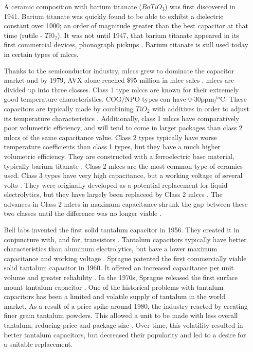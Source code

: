 A ceramic composition with barium titanate ($BaTiO_3$) was first discovered in 1941. Barium titanate was quickly found to be able to exhibit a dielectric constant over 1000; an order of magnitude greater than the best capacitor at that time (rutile - $Ti0_2$). It was not until 1947, that barium titanate appeared in its first commercial devices, phonograph pickups \cite{piezCer}\cite{hist_cerFilt}\cite[Ch 3 Sec III]{cerMaterials}. Barium titanate is still used today in certain types of \glspl{mlcc}.

Thanks to the semiconductor industry, \glspl{mlcc} grew to dominate the capacitor market and by 1979, AVX alone reached $\$95$ million in \gls{mlcc} sales \cite{avx_hist}.
\glspl{mlcc} are divided up into three classes. Class 1 type \glspl{mlcc} are known for their extremely good temperature characteristics. COG/NPO types can have 0-30ppm/$^o$C. These capacitors are typically made by combining $TiO_2$ with additives in order to adjust its temperature characteristics \cite{intro_cerCaps}. Additionally, class 1 \glspl{mlcc} have comparatively poor volumetric efficiency, and will tend to come in larger packages than class 2 \glspl{mlcc} of the same capacitance value. Class 2 types typically have worse temperature coefficients than class 1 types, but they have a much higher volumetric efficiency. They are constructed with a ferroelectric base material, typically barium titanate \cite{intro_cerCaps}. Class 2 \glspl{mlcc} are the most common type of ceramics used. Class 3 types have very high capacitance, but a working voltage of several volts \cite{hist_cerFilt}\cite[Ch 3 Sec VI]{cerMaterials}\cite{atCer_tempco}. They were originally developed as a potential replacement for liquid electrolytics, but they have largely been replaceed by Class 2 \glspl{mlcc} \cite{wiki_cer}. The advances in Class 2 \glspl{mlcc} in maximum capacitance shrunk the gap between these two classes until the difference was no longer viable \cite{wiki_cer}.

Bell labs invented the first solid tantalum capacitor in 1956. They created it in conjuncture with, and for, transistors \cite[f.~56-64]{dumInv}. Tantalum capacitors typically have better characteristics than aluminum electrolytics, but have a lower maximum capacitance and working voltage \cite{learn_caps}.
Sprague patented the first commercially viable solid tantalum capacitor in 1960. It offered an increased capacitance per unit volume and greater reliability \cite{charTant}. In the 1970s, Sprague released the first surface mount tantalum capacitor \cite{spragueHist}.
One of the historical problems with tantalum capacitors has been a limited and volatile supply of tantalum in the world market.
As a result of a price spike around 1980, the industry reacted by creating finer grain tantalum powders. This allowed a unit to be made with less overall tantalum, reducing price and package size \cite[ch~3.1]{tantMis}. Over time, this volatility resulted in better tantalum capacitors, but decreased their popularity and led to a desire for a suitable replacement.

